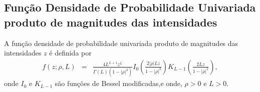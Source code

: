 %
%   
\subsection{Função Densidade de Probabilidade Univariada produto de magnitudes das intensidades}

A  função densidade de probabilidade univariada produto de magnitudes das intensidades $z$ é definida por
\begin{equation}\label{eq:pdf_mag_prod}
\begin{array}{lcl}
	f(z;\rho, L)&=&\frac{4L^{L+1}z^L}{\Gamma(L)(1-|\rho|^2)}I_0\left(\frac{2|\rho|Lz}{1-|\rho|^2}\right)K_{L-1}\left(\frac{2Lz}{1-|\rho|^2}\right),
		\end{array}
\end{equation}
onde $I_0$ e $K_{L-1}$ são funções de Bessel modificadas,e onde, $\rho>0$ e $L>0$.


